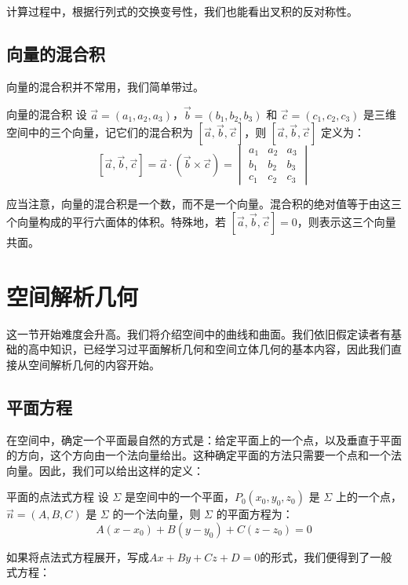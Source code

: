 计算过程中，根据行列式的交换变号性，我们也能看出叉积的反对称性。

\subsection{向量的混合积}
向量的混合积并不常用，我们简单带过。

\begin{definition}{向量的混合积}{}
设 $\vec{a} = (a_1, a_2, a_3)$，$\vec{b} = (b_1, b_2, b_3)$ 和 $\vec{c} = (c_1, c_2, c_3)$ 是三维空间中的三个向量，记它们的混合积为 $[\vec{a}, \vec{b}, \vec{c}]$，则 $[\vec{a}, \vec{b}, \vec{c}]$ 定义为：
\[ [\vec{a}, \vec{b}, \vec{c}] = \vec{a} \cdot (\vec{b} \times \vec{c}) = \begin{vmatrix}
a_1 & a_2 & a_3 \\
b_1 & b_2 & b_3 \\
c_1 & c_2 & c_3
\end{vmatrix} \]
\end{definition}

应当注意，向量的混合积是一个数，而不是一个向量。混合积的绝对值等于由这三个向量构成的平行六面体的体积。特殊地，若 $[\vec{a}, \vec{b}, \vec{c}] = 0$，则表示这三个向量共面。

\section{空间解析几何}
这一节开始难度会升高。我们将介绍空间中的曲线和曲面。我们依旧假定读者有基础的高中知识，已经学习过平面解析几何和空间立体几何的基本内容，因此我们直接从空间解析几何的内容开始。

\subsection{平面方程}

在空间中，确定一个平面最自然的方式是：给定平面上的一个点，以及垂直于平面的方向，这个方向由一个法向量给出。这种确定平面的方法只需要一个点和一个法向量。因此，我们可以给出这样的定义：

\begin{definition}{平面的点法式方程}{}
设 $\Sigma$ 是空间中的一个平面，$P_0(x_0,y_0,z_0)$ 是 $\Sigma$ 上的一个点，$\vec{n} = (A,B,C)$ 是 $\Sigma$ 的一个法向量，则 $\Sigma$ 的平面方程为：
$$A(x-x_0)+B(y-y_0)+C(z-z_0)=0$$
\end{definition}

如果将点法式方程展开，写成$Ax + By + Cz + D = 0$的形式，我们便得到了一般式方程：

